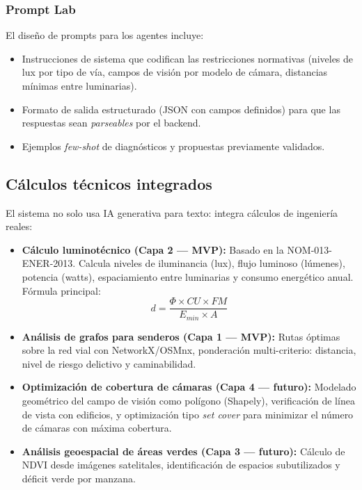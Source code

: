 \documentclass[12pt,a4paper]{article}
\begin{document}
\subsubsection{Prompt Lab}

El diseño de prompts para los agentes incluye:

\begin{itemize}[leftmargin=1.5cm, itemsep=3pt]
  \item Instrucciones de sistema que codifican las restricciones normativas (niveles de lux por tipo de vía, campos de visión por modelo de cámara, distancias mínimas entre luminarias).
  \item Formato de salida estructurado (JSON con campos definidos) para que las respuestas sean \textit{parseables} por el backend.
  \item Ejemplos \textit{few-shot} de diagnósticos y propuestas previamente validados.
\end{itemize}

\subsection{Cálculos técnicos integrados}

El sistema no solo usa IA generativa para texto: integra cálculos de ingeniería reales:

\begin{itemize}[leftmargin=1.5cm, itemsep=4pt]
  \item \textbf{Cálculo luminotécnico (Capa 2 — MVP):} Basado en la NOM-013-ENER-2013. Calcula niveles de iluminancia (lux), flujo luminoso (lúmenes), potencia (watts), espaciamiento entre luminarias y consumo energético anual. Fórmula principal:
  \[
    d = \frac{\Phi \times CU \times FM}{E_{min} \times A}
  \]

  \item \textbf{Análisis de grafos para senderos (Capa 1 — MVP):} Rutas óptimas sobre la red vial con NetworkX/OSMnx, ponderación multi-criterio: distancia, nivel de riesgo delictivo y caminabilidad.

  \item \textbf{Optimización de cobertura de cámaras (Capa 4 — futuro):} Modelado geométrico del campo de visión como polígono (Shapely), verificación de línea de vista con edificios, y optimización tipo \textit{set cover} para minimizar el número de cámaras con máxima cobertura.

  \item \textbf{Análisis geoespacial de áreas verdes (Capa 3 — futuro):} Cálculo de NDVI desde imágenes satelitales, identificación de espacios subutilizados y déficit verde por manzana.
\end{itemize}
\end{document}
